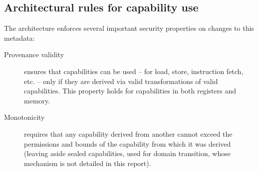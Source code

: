 \documentclass[12pt,twoside,openright,usletter]{article}
\newcommand{\note}[2]{{\color{blue}[ Note: #1 - #2]}}
\renewcommand{\note}[2]{\relax\ifhmode\unskip\fi}
\newcommand{\rwnote}[1]{\note{#1}{Robert W.}}
\newcommand{\psnote}[1]{\note{#1}{Peter S.}}
\newcommand{\pgnnote}[1]{\note{#1}{Peter N.}}
\begin{document}
\subsection{Architectural rules for capability use}

The architecture enforces several important security properties on changes to
this metadata:

\begin{description}
\item[Provenance validity] ensures that capabilities can be used -- for
  load, store, instruction fetch, etc. -- only if they are derived via valid
  transformations of valid capabilities.
  This property holds for capabilities in both registers and memory.




\item[Monotonicity] requires that any capability derived from another
  cannot exceed the permissions and bounds of the capability from which it was
  derived (leaving aside sealed capabilities, used for domain transition,
  whose mechanism is not detailed in this report).


\end{description}
\end{document}
